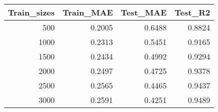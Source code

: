 \begin{tabular}{rrrr}
\toprule
Train_sizes & Train_MAE & Test_MAE & Test_R2 \\
\midrule
500 & 0.2005 & 0.6488 & 0.8824 \\
1000 & 0.2313 & 0.5451 & 0.9165 \\
1500 & 0.2434 & 0.4992 & 0.9294 \\
2000 & 0.2497 & 0.4725 & 0.9378 \\
2500 & 0.2565 & 0.4465 & 0.9437 \\
3000 & 0.2591 & 0.4251 & 0.9489 \\
\bottomrule
\end{tabular}
